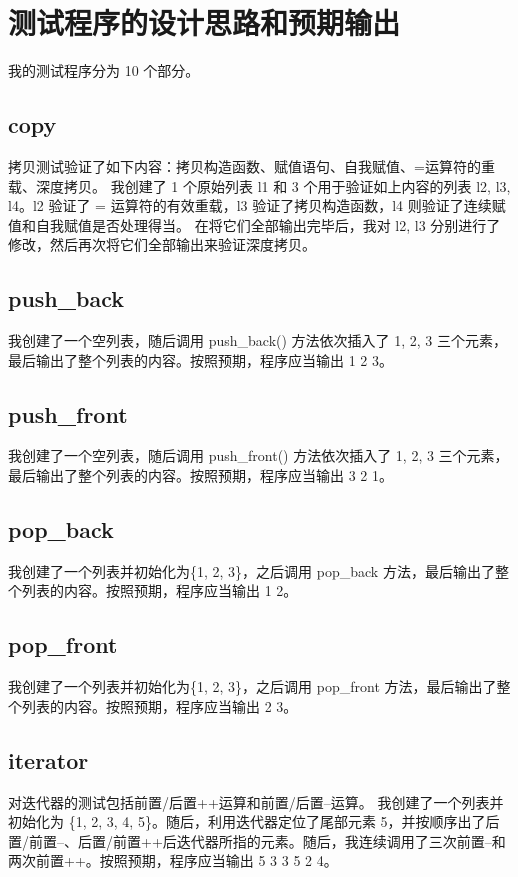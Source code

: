 \documentclass[UTF8]{ctexart}
\begin{document}
\pagestyle{fancy}
\fancyhead{}

\section{测试程序的设计思路和预期输出}

我的测试程序分为 10 个部分。

\subsection{copy}

拷贝测试验证了如下内容：拷贝构造函数、赋值语句、自我赋值、=运算符的重载、深度拷贝。
我创建了 1 个原始列表 l1 和 3 个用于验证如上内容的列表 l2, l3, l4。l2 验证了 = 运算符的有效重载，l3 验证了拷贝构造函数，l4 则验证了连续赋值和自我赋值是否处理得当。
在将它们全部输出完毕后，我对 l2, l3 分别进行了修改，然后再次将它们全部输出来验证深度拷贝。

\subsection{push\_back}
我创建了一个空列表，随后调用 push\_back() 方法依次插入了 1, 2, 3 三个元素，最后输出了整个列表的内容。按照预期，程序应当输出 1 2 3。
\subsection{push\_front}
我创建了一个空列表，随后调用 push\_front() 方法依次插入了 1, 2, 3 三个元素，最后输出了整个列表的内容。按照预期，程序应当输出 3 2 1。
\subsection{pop\_back}
我创建了一个列表并初始化为\{1, 2, 3\}，之后调用 pop\_back 方法，最后输出了整个列表的内容。按照预期，程序应当输出 1 2。
\subsection{pop\_front}
我创建了一个列表并初始化为\{1, 2, 3\}，之后调用 pop\_front 方法，最后输出了整个列表的内容。按照预期，程序应当输出 2 3。
\subsection{iterator}
对迭代器的测试包括前置/后置++运算和前置/后置--运算。
我创建了一个列表并初始化为 \{1, 2, 3, 4, 5\}。随后，利用迭代器定位了尾部元素 5，并按顺序出了后置/前置--、后置/前置++后迭代器所指的元素。随后，我连续调用了三次前置--和两次前置++。按照预期，程序应当输出 5 3 3 5 2 4。
\end{document}
